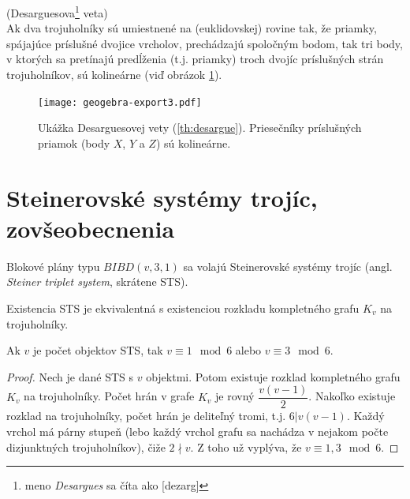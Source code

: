 \begin{theorem_hard}{(Desarguesova\footnote{meno \emph{Desargues} sa číta ako [dezarg]} veta)}\\
\label{th:desargue}
Ak dva trojuholníky sú umiestnené na (euklidovskej) rovine tak, že priamky, spájajúce príslušné dvojice vrcholov, prechádzajú spoločným bodom, tak tri body, v ktorých sa pretínajú predĺženia (t.j. priamky) troch dvojíc príslušných strán trojuholníkov, sú kolineárne (viď obrázok \ref{img:desargue}).
\end{theorem_hard}
\begin{figure}
    \centering
    \texttt{[image: geogebra-export3.pdf]}
    \caption{Ukážka Desarguesovej vety (\ref{th:desargue}). Priesečníky príslušných priamok (body $X$, $Y$ a $Z$) sú kolineárne.}
    \label{img:desargue}
\end{figure}


\section{Steinerovské systémy trojíc, zovšeobecnenia}

\begin{definition}
Blokové plány typu $BIBD(v, 3, 1)$ sa volajú Steinerovské systémy trojíc (angl. \emph{Steiner triplet system}, skrátene STS).
\end{definition}

\begin{remark}
Existencia STS je ekvivalentná s existenciou rozkladu kompletného grafu $K_v$ na trojuholníky.
\end{remark}

\begin{theorem}
\label{th:sts_nec}
Ak $v$ je počet objektov STS, tak $v \equiv 1 \mod 6$ alebo $v \equiv 3 \mod 6$.
\end{theorem}
\begin{proof}
Nech je dané STS s $v$ objektmi. 
Potom existuje rozklad kompletného grafu $K_v$ na trojuholníky.
Počet hrán v grafe $K_v$ je rovný $\dfrac{v (v-1)}{2}$.
Nakoľko existuje rozklad na trojuholníky, počet hrán je deliteľný tromi, t.j. $6 | v (v-1)$.
Každý vrchol má párny stupeň (lebo každý vrchol grafu sa nachádza v nejakom počte dizjunktných trojuholníkov), čiže $2 \nmid v$. 
Z toho už vyplýva, že $v \equiv 1, 3 \mod 6$.
\end{proof}


